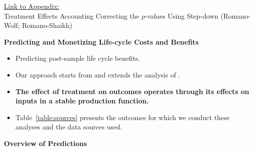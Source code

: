 \documentclass[static]{JJH-Beamer}
\begin{document}
\begin{frame}

\hypertarget{ret:frosting}{}
\begin{center}
\hyperlink{frosting}{\underline{Link to Appendix:}}\\
Treatment Effects Accounting Correcting the $p$-values Using Step-down (Romano-Wolf; Romano-Shaikh)
\end{center}

\end{frame}

\clearpage
\begin{frame}

\begin{block}{}
\begin{center}
\textbf{Predicting and Monetizing Life-cycle Costs and Benefits}
\end{center}
\end{block}

\end{frame}

\begin{frame}

\begin{itemize}
\item Predicting post-sample life cycle benefits.
\item Our approach starts from and extends the analysis of \citet{Heckman_Pinto_etal_2013_PerryFactor}.
\item \textbf{The effect of treatment on outcomes operates through its effects on inputs in a stable production function.}
\item Table~\ref{table:sources} presents the outcomes for which we conduct these analyses and the data sources used.
\end{itemize}

\end{frame}


\begin{frame}

\begin{center}
\textbf{Overview of Predictions}
\end{center}

\end{frame}
\end{document}

